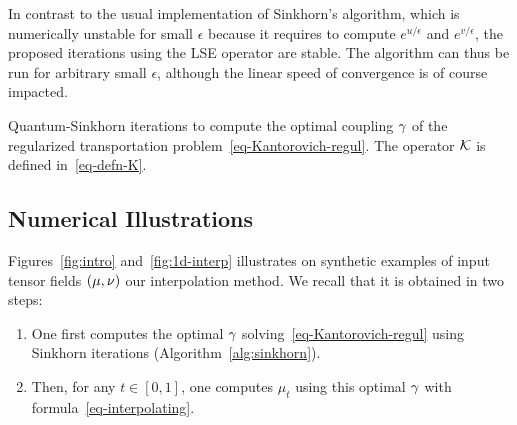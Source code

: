 \begin{rem}[Stability]In contrast to the usual implementation of Sinkhorn's algorithm, which is numerically unstable for small $\epsilon$ because it requires to compute $e^{u/\epsilon}$ and $e^{v/\epsilon}$, the proposed iterations using the LSE operator are stable. The algorithm can thus be run for arbitrary small $\epsilon$, although the linear speed of convergence is of course impacted. 
\end{rem}


\begin{algorithm}[t]
\fbox{\hspace{-.1in}\parbox{\columnwidth}{%
\begin{algorithmic}
\Function{Quantum-Sinkhorn}{$\mu,\nu,c,\epsilon,\rho_1,\rho_2$}
	\algspace
	\State $\foralls k=1,2, \quad \tau_k \in ]0,\tfrac{2 \epsilon}{\epsilon+\rho_k}[$, 
	\Let{$\foralls (i,j) \in I \times J, \quad (u_i,v_j)$}{$(0_{d \times d}, 0_{d \times d})$}
	\For{$s=1,2,3,\ldots$}
		\Let{$K$}{$\Kern(u,v)$}
		\State $\foralls i \in I, \quad u_i \RelaxAssign{\tau_1} \LSE_j(K_{i,j})-\log(\mu_i)$
		\Let{$K$}{$\Kern(u,v)$}
		\State $\foralls j \in J, \quad v_j \RelaxAssign{\tau_2} \LSE_i(K_{i,j})-\log(\nu_j)$
	\EndFor
	\State\Return{$(\ga_{i,j} = \exp(K_{i,j}))_{i,j}$}
\EndFunction
  \end{algorithmic}
}}
\caption{Quantum-Sinkhorn iterations to compute the optimal coupling $\gamma$ of the regularized transportation problem~\eqref{eq-Kantorovich-regul}. The operator $\mathcal{K}$ is defined in~\eqref{eq-defn-K}.\label{alg:sinkhorn}}
\end{algorithm}


\subsection{Numerical Illustrations}
\label{sec-numerics-interp}

Figures~\ref{fig:intro} and~\ref{fig:1d-interp} illustrates on synthetic examples of input tensor fields $(\mu,\nu)$ our interpolation method. 
%
We recall that it is obtained in two steps:
\begin{enumerate}
	\item One first computes the optimal $\gamma$ solving~\eqref{eq-Kantorovich-regul} using Sinkhorn iterations (Algorithm~\ref{alg:sinkhorn}).
	\item Then, for any $t \in [0,1]$, one computes $\mu_t$ using this optimal $\gamma$ with formula~\eqref{eq-interpolating}.
\end{enumerate}
   

